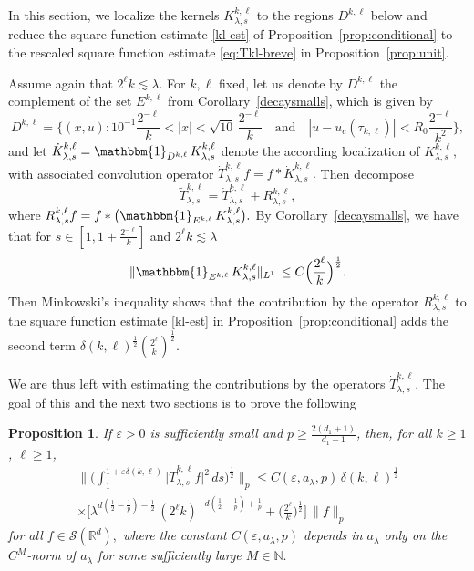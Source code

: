 \documentclass[leqno]{amsart}
\newtheorem{proposition}[theorem]{Proposition}
\theoremstyle{definition}
\theoremstyle{remark}
\numberwithin{equation}{section}
\newcommand{\bbone}{{\mathbbm{1}}}
\newcommand{\R}{\mathbb{R}}
\newcommand{\N}{\mathbb{N}}
\newcommand\la{{\lambda}}
\newcommand\ve{{\varepsilon}}
\newcommand{\chr}{\bbone}
\begin{document}
In this section, we localize the kernels $K_{\lambda,s}^{k,\ell}$ to the regions $D^{k,\ell}$ below and reduce the square function estimate \eqref{kl-est} of Proposition~\ref{prop:conditional} to the rescaled square function estimate \eqref{eq:Tkl-breve} in Proposition~\ref{prop:unit}.

Assume again that $2^\ell k\lesssim \la.$
For  $k,\ell$ fixed, let us denote by $D^{k,\ell}$ the complement of the set 
$E^{k,\ell}$ from Corollary~\ref{decaysmalls}, which is given by
\begin{equation}\label{eq:B-kell}
D^{k,\ell}=\Big\{(x,u):10^{-1}\frac{2^{-\ell}}{k} <|x|< \sqrt{10}\,\frac{2^{-\ell}}{k}\quad \text{and} \quad |u-u_c (\tau_{k,\ell})| <  R_0 \frac{2^{-\ell}}{k^2}\Big\},
\end{equation}
and let $\dot{K}_{\lambda,s}^{k,\ell}=\chr_{D^{k,\ell}} \,K_{\lambda,s}^{k,\ell}$  denote the according  localization of 
$K_{\lambda,s}^{k,\ell},$ with associated convolution operator $ \dot T_{\lambda,s}^{k,\ell} f=f*\dot{K}_{\lambda,s}^{k,\ell}.$
Then decompose 
\begin{equation}\label{TdotTR}
\tilde T_{\lambda,s}^{k,\ell}=\dot {T}_{\lambda,s}^{k,\ell}+R_{\lambda,s}^{k,\ell},
\end{equation}
where 
$R_{\lambda,s}^{k,\ell}f=f*\big(\chr_{E^{k,\ell}} \,K_{\lambda,s}^{k,\ell}\big).$ 
By  Corollary~\ref{decaysmalls}, we have that for $s\in[1,1+\frac{2^{-\ell}}{k}]$ and $2^{\ell}k\lesssim \la$
\[
\|\chr_{E^{k,\ell}} \,K_{\lambda,s}^{k,\ell}\|_{L^1} \,\le C \Big(\frac{2^{\ell}}{k}\Big)^{\frac{1}{2}}.
\]
Then  Minkowski's inequality  shows that the contribution by the operator  $R_{\lambda,s}^{k,\ell}$  to the square function estimate  \eqref{kl-est} in Proposition~\ref{prop:conditional} adds  the second term $\delta(k,\ell)^{\frac 12}(\frac{2^{\ell}}{k})^{\frac{1}{2}}.$ 


We are thus left with estimating the contributions by the operators $\dot{T}_{\lambda,s}^{k,\ell}.$ 
The goal of this  and the next two sections  is to prove the following


\begin{proposition}\label{prop:inter-Lp}
If $\ve>0$ is sufficiently small and $p\ge \frac{2(d_1+1)}{d_1-1}$, then, for all $k\ge 1$, $\ell \ge 1$,
\begin{multline}
\Big\| \Big( \int_1^{1+\ve\delta(k,\ell)} \big| \dot{T}_{\lambda,s}^{k,\ell} f \big|^2 \, ds \Big)^{\frac{1}{2}} \Big\|_p
\le C(\ve,a_\la,p)\, \delta(k,\ell)^{\frac 12}\\
\times\Big[\lambda^{d(\frac 12 - \frac 1p )-\frac 12} \, (2^\ell k)^{-d(\frac 12 - \frac 1p ) + \frac1p } + \Big(\frac{2^{\ell}}{k}\Big)^{\frac{1}{2}} \Big]
\, \|f\|_p \label{eq:inter-Lp}
\end{multline}
for all $f\in \mathcal S(\R^d),$ where the constant  $C(\ve,a_\lambda, p)$ depends in $a_\la$ only on the $C^M$-norm of $a_\lambda$ for some sufficiently large $M\in\N.$
\end{proposition}
\end{document}

